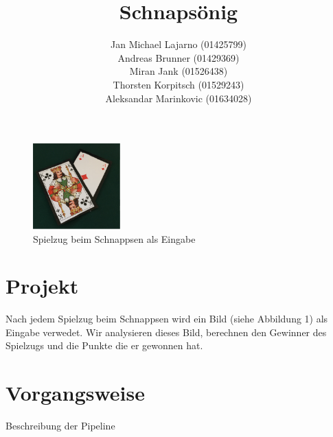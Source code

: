 \documentclass[deutsch]{scrartcl}
\begin{document}
\title{Schnaps\"onig} %

\author{Jan Michael Lajarno (01425799)\\
Andreas Brunner (01429369)\\
Miran Jank (01526438)\\
Thorsten Korpitsch (01529243)\\
Aleksandar Marinkovic (01634028)}
\date{\vspace{-5ex}}




\maketitle

\begin{figure}[h!]
	\centering
	\includegraphics[width=0.3\textwidth]{titelbild.png}
	\caption{Spielzug beim Schnappsen als Eingabe}
	\label{fig:erg}
\end{figure}


\section*{Projekt}
Nach jedem Spielzug beim Schnappsen wird ein Bild (siehe Abbildung 1) als Eingabe verwedet. 
Wir analysieren dieses Bild, berechnen den Gewinner des Spielzugs und die Punkte die er gewonnen hat.

\section*{Vorgangsweise}

Beschreibung der Pipeline
\end{document}
